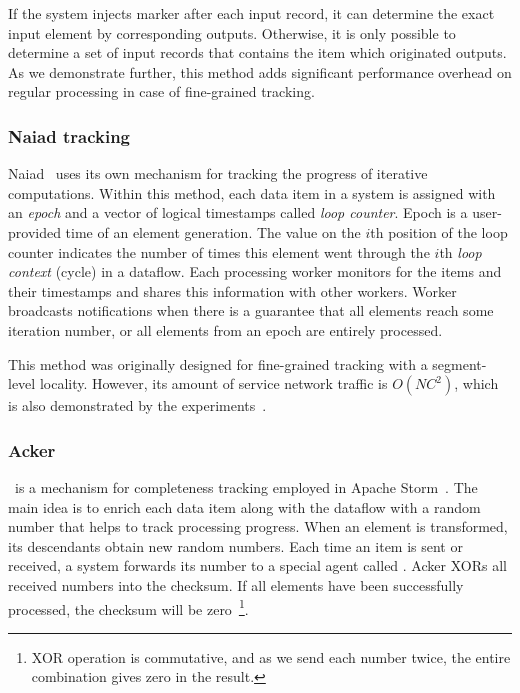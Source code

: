 If the system injects marker after each input record, it can determine the exact input element by corresponding outputs. Otherwise, it is only possible to determine a set of input records that contains the item which originated outputs. As we demonstrate further, this method adds significant performance overhead on regular processing in case of fine-grained tracking.

\subsubsection{Naiad tracking}

Naiad~\cite{Murray:2013:NTD:2517349.2522738} uses its own mechanism for tracking the progress of iterative computations. Within this method, each data item in a system is assigned with an {\em epoch} and a vector of logical timestamps called {\em loop counter}. Epoch is a user-provided time of an element generation. The value on the $i$th position of the loop counter indicates the number of times this element went through the $i$th {\em loop context} (cycle) in a dataflow. Each processing worker monitors for the items and their timestamps and shares this information with other workers. Worker broadcasts notifications when there is a guarantee that all elements reach some iteration number, or all elements from an epoch are entirely processed.

This method was originally designed for fine-grained tracking with a segment-level locality. However, its amount of service network traffic is $O(NC^2)$, which is also demonstrated by the experiments~\cite{Murray:2013:NTD:2517349.2522738}.



\subsubsection{Acker}

\acker\ is a mechanism for completeness tracking employed in Apache Storm~\cite{apache:storm}. The main idea is to enrich each data item along with the dataflow with a random number that helps to track processing progress. When an element is transformed, its descendants obtain new random numbers. Each time an item is sent or received, a system forwards its number to a special agent called {\em \acker}. Acker XORs all received numbers into the checksum. If all elements have been successfully processed, the checksum will be zero~\footnote{XOR operation is commutative, and as we send each number twice, the entire combination gives zero in the result.}.


